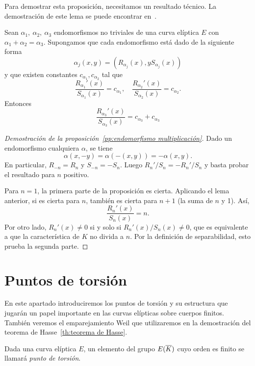Para demostrar esta proposición, necesitamos un resultado técnico. La demostración de este lema se puede encontrar en~\cite[sec 2.9]{Washington:2008}.

\begin{lema}\label{lm:cociente derivadas funciones racionales}
	Sean $\alpha_1,\ \alpha_2,\ \alpha_3$ endomorfismos no triviales de una curva elíptica $E$ con $\alpha_1 + \alpha_2 = \alpha_3$. Supongamos que cada endomorfismo está dado de la siguiente forma
	$$
		\alpha_j(x, y) = (R_{\alpha_j}(x), y S_{\alpha_j}(x))
	$$
	y que existen constantes $c_{\alpha_1}, c_{\alpha_2}$ tal que
	$$
		\frac{R_{\alpha_1}'(x)}{S_{\alpha_1}(x)} = c_{\alpha_1}, \quad  \frac{R_{\alpha_2}'(x)}{S_{\alpha_2}(x)} = c_{\alpha_2}.
	$$
	Entonces
	$$
		\frac{R_{\alpha_3}'(x)}{S_{\alpha_3}(x)} = c_{\alpha_3} + c_{\alpha_3}
	$$
\end{lema}

\begin{proof}[Demostración de la proposición~\ref{pp:endomorfismo multiplicación}]
Dado un endomorfismo cualquiera $\alpha$, se tiene
$$
	\alpha(x, -y) = \alpha(-(x, y)) = - \alpha(x, y).
$$
En particular, $R_{-n} = R_n$ y $S_{-n} = -S_n$. Luego $R_n' / S_n = - R_n' / S_n$ y basta probar el resultado para $n$ positivo.

Para $n = 1$, la primera parte de la proposición es cierta. Aplicando el lema anterior, si es cierta para $n$, también es cierta para $n +1$ (la suma de $n$ y 1). Así,
$$
	\frac{R_n'(x)}{S_n(x)} = n.
$$
Por otro lado, $R_n'(x) \neq 0$ si y solo si $R_n'(x) / S_n(x) \neq 0$, que es equivalente a que la característica de $K$ no divida a $n$. Por la definición de separabilidad, esto prueba la segunda parte.
\end{proof}

\clearpage

\section{Puntos de torsión}
\label{sec:Puntos de torsión}

En este apartado introduciremos los puntos de torsión y su estructura que jugarán un papel importante en las curvas elípticas sobre cuerpos finitos. También veremos el emparejamiento Weil que utilizaremos en la demostración del teorema de Hasse~\ref{th:teorema de Hasse}.

\begin{definicion}
	Dada una curva elíptica $E$, un elemento del grupo $E(\overline{K})$ cuyo orden es finito se llamará \emph{punto de torsión}.
\end{definicion}

